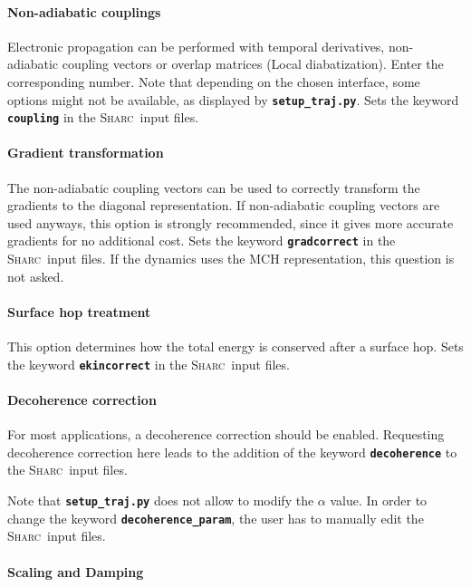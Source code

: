 \documentclass[a4paper,11pt,DIV=15,openany,twoside=false]{scrbook}
\newcommand{\sharc}{\textsc{Sharc}}
\newcommand{\ttt}[1]{\textbf{\texttt{#1}}}
\begin{document}
\paragraph{Non-adiabatic couplings}

Electronic propagation can be performed with temporal derivatives, non-adiabatic coupling vectors or overlap matrices (Local diabatization). Enter the corresponding number. Note that depending on the chosen interface, some options might not be available, as displayed by \ttt{setup\_traj.py}. Sets the keyword \ttt{coupling} in the \sharc\ input files.

\paragraph{Gradient transformation}

The non-adiabatic coupling vectors can be used to correctly transform the gradients to the diagonal representation. If non-adiabatic coupling vectors are used anyways, this option is strongly recommended, since it gives more accurate gradients for no additional cost. Sets the keyword \ttt{gradcorrect} in the \sharc\ input files. If the dynamics uses the MCH representation, this question is not asked. 

\paragraph{Surface hop treatment}

This option determines how the total energy is conserved after a surface hop. Sets the keyword \ttt{ekincorrect} in the \sharc\ input files.

\paragraph{Decoherence correction}

For most applications, a decoherence correction should be enabled. Requesting decoherence correction here leads to the addition of the keyword \ttt{decoherence} to the \sharc\ input files. 

Note that \ttt{setup\_traj.py} does not allow to modify the $\alpha$ value. In order to change the keyword \ttt{decoherence\_param}, the user has to manually edit the \sharc\ input files.

\paragraph{Scaling and Damping}
\end{document}
